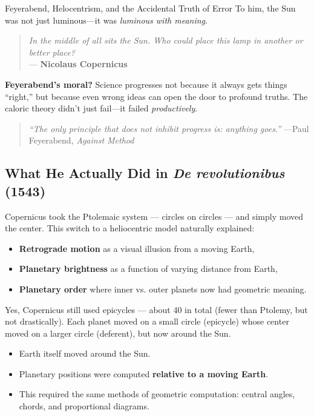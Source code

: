 \begin{HistoricalSidebar}{Feyerabend, Helocentrism, and the Accidental Truth of Error}
  To him, the Sun was not just luminous—it was \textit{luminous with meaning}.

  \medskip

  \begin{quote}
  \textit{In the middle of all sits the Sun. Who could place this lamp in another or better place?} \\
  — \textbf{Nicolaus Copernicus}
  \end{quote}
  
  \medskip
  
  \textbf{Feyerabend’s moral?} Science progresses not because it always gets things “right,” but because even wrong 
  ideas can open the door to profound truths. The caloric theory didn’t just fail—it failed \textit{productively}.

  \medskip
  
  \begin{quote}
  \textit{“The only principle that does not inhibit progress is: anything goes.”} —Paul Feyerabend, \textit{Against Method}
  \end{quote}
  
\end{HistoricalSidebar}

\subsection{What He Actually Did in \textit{De revolutionibus} (1543)}

Copernicus took the Ptolemaic system — circles on circles — and simply moved the center. This switch to a heliocentric model naturally explained:

\begin{itemize}
  \item \textbf{Retrograde motion} as a visual illusion from a moving Earth,
  \item \textbf{Planetary brightness} as a function of varying distance from Earth,
  \item \textbf{Planetary order} where inner vs. outer planets now had geometric meaning.
\end{itemize}

Yes, Copernicus still used epicycles — about 40 in total (fewer than Ptolemy, but not drastically). Each planet moved on a small circle (epicycle) whose center moved on a larger circle (deferent), but now around the Sun.

\begin{itemize}
  \item Earth itself moved around the Sun.
  \item Planetary positions were computed \textbf{relative to a moving Earth}.
  \item This required the same methods of geometric computation: central angles, chords, and proportional diagrams.
\end{itemize}

